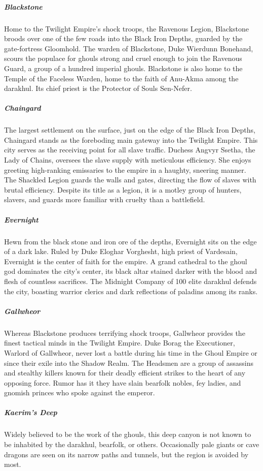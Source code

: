 \documentclass[10pt,a4paper,twoside,bg=print,twocolumn,openany,nodeprecatedcode]{dndbook}
\begin{document}
\subparagraph{Blackstone}
Home to the Twilight Empire's shock troops, the Ravenous Legion, Blackstone broods over one of the few roads into the Black Iron Depths, guarded by the gate-fortress Gloomhold. The warden of Blackstone, Duke Wierdunn Bonehand, scours the populace for ghouls strong and cruel enough to join the Ravenous Guard, a group of a hundred imperial ghouls. Blackstone is also home to the Temple of the Faceless Warden, home to the faith of Anu-Akma among the darakhul. Its chief priest is the Protector of Souls Sen-Nefer.

\subparagraph{Chaingard}
The largest settlement on the surface, just on the edge of the Black Iron Depths, Chaingard stands as the foreboding main gateway into the Twilight Empire. This city serves as the receiving point for all slave traffic. Duchess Angvyr Ssetha, the Lady of Chains, oversees the slave supply with meticulous efficiency. She enjoys greeting high-ranking emissaries to the empire in a haughty, sneering manner. The Shackled Legion guards the walls and gates, directing the flow of slaves with brutal efficiency. Despite its title as a legion, it is a motley group of hunters, slavers, and guards more familiar with cruelty than a battlefield.

\subparagraph{Evernight}
Hewn from the black stone and iron ore of the depths, Evernight sits on the edge of a dark lake. Ruled by Duke Eloghar Vorghesht, high priest of Vardesain, Evernight is the center of faith for the empire. A grand cathedral to the ghoul god dominates the city's center, its black altar stained darker with the blood and flesh of countless sacrifices. The Midnight Company of 100 elite darakhul defends the city, boasting warrior clerics and dark reflections of paladins among its ranks.

\subparagraph{Gallwheor}
Whereas Blackstone produces terrifying shock troops, Gallwheor provides the finest tactical minds in the Twilight Empire. Duke Borag the Executioner, Warlord of Gallwheor, never lost a battle during his time in the Ghoul Empire or since their exile into the Shadow Realm. The Headsmen are a group of assassins and stealthy killers known for their deadly efficient strikes to the heart of any opposing force. Rumor has it they have slain bearfolk nobles, fey ladies, and gnomish princes who spoke against the emperor.

\subparagraph{Kaerim's Deep}
Widely believed to be the work of the ghouls, this deep canyon is not known to be inhabited by the darakhul, bearfolk, or others. Occasionally pale giants or cave dragons are seen on its narrow paths and tunnels, but the region is avoided by most.
\end{document}
